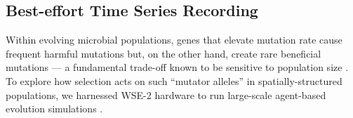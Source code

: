 \subsection{Best-effort Time Series Recording}
\label{moreno:sec:case2:timeseries}



Within evolving microbial populations, genes that elevate mutation rate cause frequent harmful mutations but, on the other hand, create rare beneficial mutations --- a fundamental trade-off known to be sensitive to population size \cite{raynes2018sign}.
To explore how selection acts on such ``mutator alleles'' in spatially-structured populations, we harnessed WSE-2 hardware to run large-scale agent-based evolution simulations \cite{moreno2025hypermutatorsc}.

